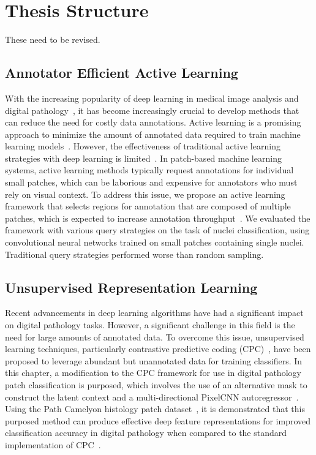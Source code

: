 \section{Thesis Structure}
\label{sec:thesis_structure}
These need to be revised.

\subsection*{Annotator Efficient Active Learning}
With the increasing popularity of deep learning in medical image analysis and digital pathology~\citep{tizhoosh2018artificial}, it has become increasingly crucial to develop methods that can reduce the need for costly data annotations. Active learning is a promising approach to minimize the amount of annotated data required to train machine learning models~\citep{settles2012active}. However, the effectiveness of traditional active learning strategies with deep learning is limited~\citep{wang2016cost}. In patch-based machine learning systems, active learning methods typically request annotations for individual small patches, which can be laborious and expensive for annotators who must rely on visual context. To address this issue, we propose an active learning framework that selects regions for annotation that are composed of multiple patches, which is expected to increase annotation throughput~\citep{carse2019active}. We evaluated the framework with various query strategies on the task of nuclei classification, using convolutional neural networks trained on small patches containing single nuclei. Traditional query strategies performed worse than random sampling.

\subsection*{Unsupervised Representation Learning}
Recent advancements in deep learning algorithms have had a significant impact on digital pathology tasks. However, a significant challenge in this field is the need for large amounts of annotated data. To overcome this issue, unsupervised learning techniques, particularly contrastive predictive coding (CPC)~\citep{oord2018representation}, have been proposed to leverage abundant but unannotated data for training classifiers. In this chapter, a modification to the CPC framework for use in digital pathology patch classification is purposed, which involves the use of an alternative mask to construct the latent context and a multi-directional PixelCNN autoregressor~\citep{oord2016pixel}. Using the Path Camelyon histology patch dataset~\citep{veeling2018rotation}, it is demonstrated that this purposed method can produce effective deep feature representations for improved classification accuracy in digital pathology when compared to the standard implementation of CPC~\citep{carse2021unsupervised}.

